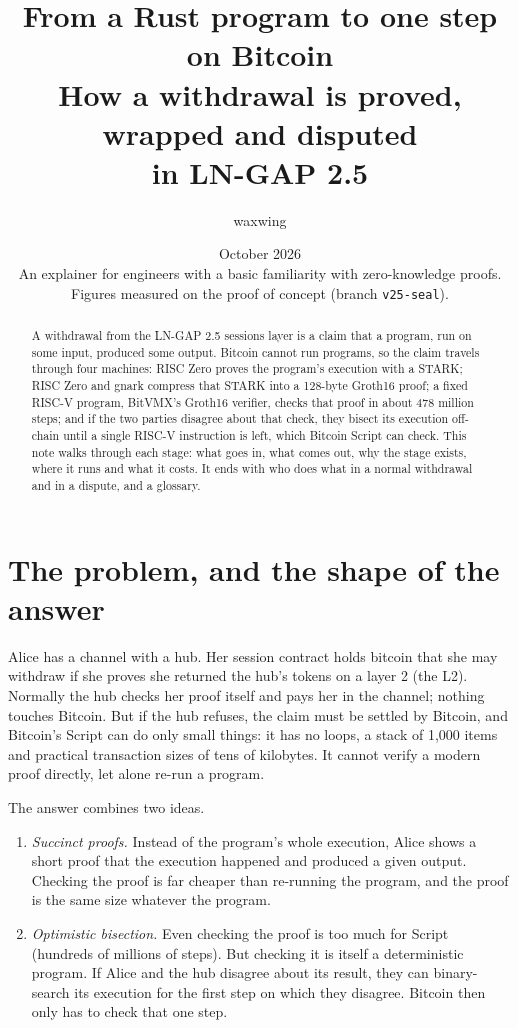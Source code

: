\documentclass[11pt]{article}
\title{\textbf{From a Rust program to one step on Bitcoin}\\How a withdrawal is proved, wrapped and disputed\\in LN-GAP 2.5}
\author{waxwing}
\date{October 2026 \\ \medskip An explainer for engineers with a basic familiarity with zero-knowledge proofs.\\Figures measured on the proof of concept (branch \texttt{v25-seal}).}
\begin{document}
\maketitle

\begin{abstract}
A withdrawal from the LN-GAP 2.5 sessions layer is a claim that a
program, run on some input, produced some output. Bitcoin cannot run
programs, so the claim travels through four machines: RISC Zero proves
the program's execution with a STARK; RISC Zero and gnark compress that
STARK into a 128-byte Groth16 proof; a fixed RISC-V program, BitVMX's
Groth16 verifier, checks that proof in about 478 million steps; and if
the two parties disagree about that check, they bisect its execution
off-chain until a single RISC-V instruction is left, which Bitcoin
Script can check. This note walks through each stage: what goes in, what
comes out, why the stage exists, where it runs and what it costs. It
ends with who does what in a normal withdrawal and in a dispute, and a
glossary.
\end{abstract}

\tableofcontents

\section{The problem, and the shape of the answer}
\label{sec:problem}

Alice has a channel with a hub. Her session contract holds bitcoin that
she may withdraw if she proves she returned the hub's tokens on a layer
2 (the L2). Normally the hub checks her proof itself and pays her in the
channel; nothing touches Bitcoin. But if the hub refuses, the claim must
be settled by Bitcoin, and Bitcoin's Script can do only small things: it
has no loops, a stack of 1,000 items and practical transaction sizes of
tens of kilobytes. It cannot verify a modern proof directly, let alone
re-run a program.

The answer combines two ideas.
\begin{enumerate}[leftmargin=1.5em]
\item \emph{Succinct proofs.} Instead of the program's whole execution,
  Alice shows a short proof that the execution happened and produced a
  given output. Checking the proof is far cheaper than re-running the
  program, and the proof is the same size whatever the program.
\item \emph{Optimistic bisection.} Even checking the proof is too much
  for Script (hundreds of millions of steps). But checking it is itself
  a deterministic program. If Alice and the hub disagree about its
  result, they can binary-search its execution for the first step on
  which they disagree. Bitcoin then only has to check that one step.
\end{enumerate}
\end{document}
